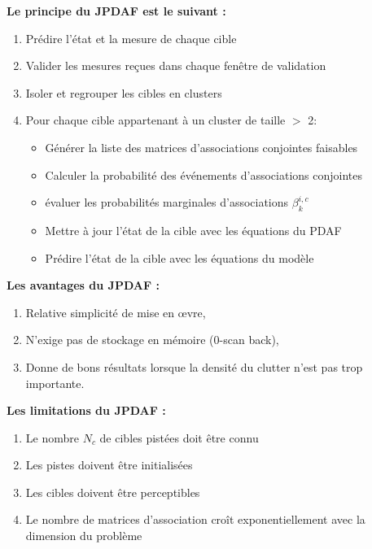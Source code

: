 \documentclass[10pt,french,a4paper]{report}
\begin{document}
  \textbf{Le principe du \ac{JPDAF} est le suivant :}
    \begin{enumerate}[label = \arabic*.]
  \item  Prédire l'état et la mesure de chaque cible
  \item  Valider les mesures reçues dans chaque fenêtre de validation
  \item  Isoler et regrouper les cibles en clusters
  \item  Pour chaque cible appartenant à un cluster de taille $>$ 2:
    \begin{itemize}[label =  $\square$ ]
  \item Générer la liste des matrices d'associations conjointes faisables
  \item  Calculer la probabilité des événements d'associations conjointes
  \item  évaluer les probabilités marginales d'associations $\beta_k^{i,c}$
  \item  Mettre à jour l'état de la cible avec les équations du PDAF
  \item  Prédire l'état de la cible avec les équations du modèle
  \end{itemize}
 \end{enumerate}

\textbf{Les avantages du \acf{JPDAF} :}
\begin{enumerate}[label = \arabic*.]
 \item Relative simplicité de mise en \oe vre,
 \item  N'exige pas de stockage en mémoire (0-scan back),
 \item Donne de bons résultats lorsque la densité du clutter n'est pas trop importante.
 \end{enumerate}
 
 
\textbf{Les limitations du \ac{JPDAF} :}
\begin{enumerate}[label = \arabic*.]
 \item Le nombre $N_c$ de cibles pistées doit être connu
 \item Les pistes doivent être initialisées
 \item Les cibles doivent être perceptibles
 \item Le nombre de matrices d'association croît exponentiellement avec la dimension du problème
  \end{enumerate}
  
  
\end{document}
